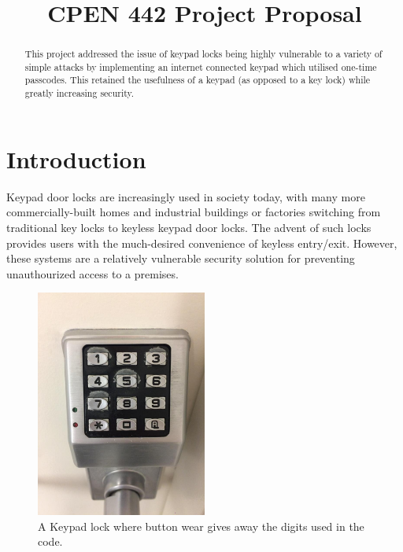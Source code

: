 \documentclass[conference]{IEEEtran}
\begin{document}
\title{CPEN 442 Project Proposal}

\author{
}

\maketitle

\begin{abstract}
	This project addressed the issue of keypad locks being highly vulnerable to a variety of simple attacks by implementing an internet connected keypad which utilised one-time passcodes. This retained the usefulness of a keypad (as opposed to a key lock) while greatly increasing security.
\end{abstract}

\section{Introduction}
	Keypad door locks are increasingly used in society today, with many more commercially-built homes and industrial buildings or factories switching from traditional key locks to keyless keypad door locks.
The advent of such locks provides users with the much-desired convenience of keyless entry/exit.
However, these systems are a relatively vulnerable security solution for preventing unauthourized access to a premises. 

\begin{figure}[htbp]
\centerline{\includegraphics[width=0.5\textwidth]{worn_lock.jpg}}
\caption{A Keypad lock where button wear gives away the digits used in the code.}
\label{fig:worn_lock}
\end{figure}
\end{document}
